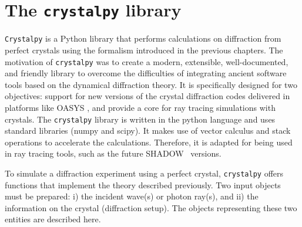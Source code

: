 \documentclass{iucr}
\newcommand{\todo}[1]{{\color{red}[TODO: "#1'']}}
\begin{document}


%
\section{The {\tt crystalpy} library}
\label{sec:crystalpy}

{\tt Crystalpy} is a Python library that performs calculations on diffraction
from perfect crystals using the formalism introduced in the previous chapters.
The motivation of {\tt crystalpy} 
was to create a modern, extensible, well-documented, and friendly library to overcome the difficulties of integrating ancient software tools based on the dynamical diffraction theory. It is specifically designed for two objectives: support for new versions of the crystal diffraction codes delivered in platforms like OASYS \cite{codeOASYS}, and provide a core for ray tracing simulations with crystals.  
The {\tt crystalpy} library is written in the python language and uses standard libraries (numpy and scipy). It makes use of vector calculus and stack operations to accelerate the calculations. Therefore, it is adapted for being used in ray tracing tools, such as the future SHADOW~\cite{codeSHADOW} versions. 

To simulate a diffraction experiment using a perfect crystal, {\tt crystalpy}  offers functions that implement the theory described previously. Two input objects must be prepared: i) the incident wave(s) or  photon ray(s), and ii) the information on the crystal (diffraction setup). The objects representing these two entities are described here. 
\end{document}
